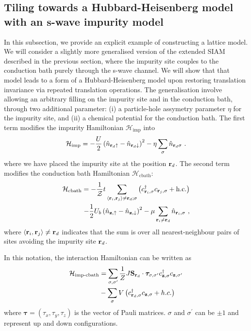 \documentclass[reprint,hidelinks]{revtex4-2}
\begin{document}
\subsection{Tiling towards a Hubbard-Heisenberg model with an s-wave impurity model}
In this subsection, we provide an explicit example of constructing a lattice model. We will consider a slightly more generalised version of the extended SIAM described in the previous section, where the impurity site couples to the conduction bath purely through the s-wave channel. We will show that that model leads to a form of a Hubbard-Heisenberg model upon restoring translation invariance via repeated translation operations. The generalisation involve allowing an arbitrary filling on the impurity site and in the conduction bath, through two additional parameter: (i) a particle-hole assymetry parameter \(\eta\) for the impurity site, and (ii) a chemical potential for the conduction bath. The first term modifies the impurity Hamiltonian \(\mathcal{H}_\text{imp}\) into
\begin{equation}\begin{aligned}
	\mathcal{H}_\text{imp} = -\frac{U}{2}\left(\hat n_{{\bf r}_d \uparrow} - \hat n_{{\bf r}_d \downarrow} \right)^2 - \eta\sum_\sigma \hat n_{{\bf r}_d\sigma}~.
\end{aligned}\end{equation}
where we have placed the impurity site at the position \({\bf r}_d\). The second term modifies the conduction bath Hamiltonian \(\mathcal{H}_\text{cbath}\):
\begin{equation}\begin{aligned}
	\mathcal{H}_\text{cbath} = -\frac{1}{\mathcal{Z}}t\sum_{\left<{\bf r}_i, {\bf r}_j\right>\neq{\bf r}_d;\sigma}\left(c^\dagger_{{\bf r}_i,\sigma}c_{{\bf r}_j,\sigma} + \text{h.c.}\right)\\
	- \frac{1}{2}U_b\left(\hat n_{{\bf z}, \uparrow} - \hat n_{{\bf z}, \downarrow}\right)^2 - \mu \sum_{{\bf r}_i \neq {\bf r}_d}\hat n_{{\bf r}_i,\sigma}~,
\end{aligned}\end{equation}
where \(\left<{\bf r}_i, {\bf r}_j\right>\neq {\bf r}_d\) indicates that the sum is over all nearest-neighbour pairs of sites avoiding the impurity site \({\bf r}_d\).

In this notation, the interaction Hamiltonian can be written as
\begin{equation}\begin{aligned}
	\mathcal{H}_\text{imp-cbath} &= \sum_{\sigma,\sigma^\prime}\frac{1}{ Z}J {\bf S}_{{\bf r}_d}\cdot{\boldsymbol \tau}_{\sigma,\sigma^\prime}c^\dagger_{{\bf z},\sigma}c_{{\bf z},\sigma^\prime} \\
				     &-  \sum_{\sigma} V \left(c^\dagger_{{\bf r}_d,\sigma} c_{{{\bf z}},\sigma} + h.c.\right)
\end{aligned}\end{equation}
where \(\boldsymbol \tau = \left( \tau_x, \tau_y, \tau_z \right) \) is the vector of Pauli matrices. \(\sigma\) and \(\sigma^\prime\) can be \(\pm 1\) and represent up and down configurations.
\end{document}
